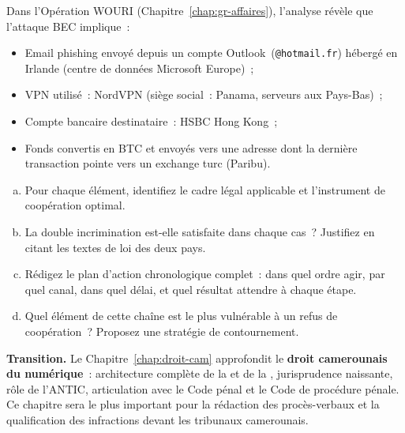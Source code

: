 \begin{boxexo}[title={\ding{45}\quad Exercice~11.3 --- Stratégie juridique complète \niveauexpert}]
Dans l'Opération WOURI (Chapitre~\ref{chap:gr-affaires}), l'analyse
révèle que l'attaque BEC implique~:
\begin{itemize}
    \item Email phishing envoyé depuis un compte Outlook~(\texttt{@hotmail.fr})
          hébergé en Irlande (centre de données Microsoft Europe)~;
    \item VPN utilisé~: NordVPN (siège social~: Panama, serveurs
          aux Pays-Bas)~;
    \item Compte bancaire destinataire~: HSBC Hong Kong~;
    \item Fonds convertis en BTC et envoyés vers une adresse dont la
          dernière transaction pointe vers un exchange turc (Paribu).
\end{itemize}
\begin{enumerate}[(a)]
    \item Pour chaque élément, identifiez le cadre légal applicable et
          l'instrument de coopération optimal.
    \item La double incrimination est-elle satisfaite dans chaque cas~?
          Justifiez en citant les textes de loi des deux pays.
    \item Rédigez le plan d'action chronologique complet~: dans quel
          ordre agir, par quel canal, dans quel délai, et quel résultat
          attendre à chaque étape.
    \item Quel élément de cette chaîne est le plus vulnérable à un
          refus de coopération~? Proposez une stratégie de contournement.
\end{enumerate}
\end{boxexo}

\bigskip

\begin{boxinfo}
\textbf{Transition.} Le Chapitre~\ref{chap:droit-cam} approfondit le
\textbf{droit camerounais du numérique}~: architecture complète de
la  et de la , jurisprudence naissante,
rôle de l'ANTIC, articulation avec le Code pénal et le Code de procédure
pénale. Ce chapitre sera le plus important pour la rédaction des
procès-verbaux et la qualification des infractions devant les tribunaux
camerounais.
\end{boxinfo}
